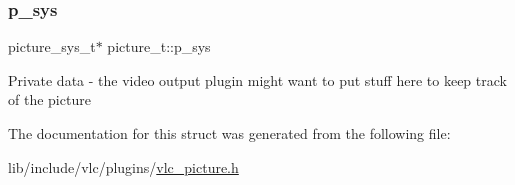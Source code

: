 \subsubsection{\texorpdfstring{p\+\_\+sys}{p\_sys}}
{\footnotesize\ttfamily picture\+\_\+sys\+\_\+t$\ast$ picture\+\_\+t\+::p\+\_\+sys}

Private data -\/ the video output plugin might want to put stuff here to keep track of the picture 

The documentation for this struct was generated from the following file\+:\begin{DoxyCompactItemize}
\item 
lib/include/vlc/plugins/\hyperlink{vlc__picture_8h}{vlc\+\_\+picture.\+h}\end{DoxyCompactItemize}
